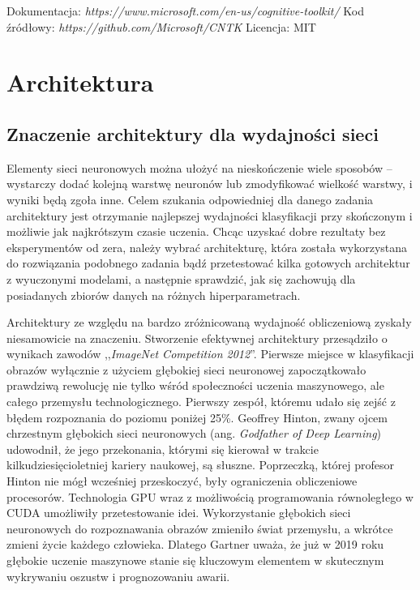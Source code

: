 \documentclass[12pt,a4paper,twoside,titlepage,openright]{book}
\begin{document}
\begin{itemize}
\noindent
\newline
Dokumentacja: \textit{https://www.microsoft.com/en-us/cognitive-toolkit/}
\newline
Kod źródłowy: \textit{https://github.com/Microsoft/CNTK}
\newline
Licencja: MIT



\chapter{Architektura}
\section{Znaczenie architektury dla wydajności sieci}
Elementy sieci neuronowych można ułożyć na nieskończenie wiele sposobów -- wystarczy dodać kolejną warstwę neuronów lub zmodyfikować wielkość warstwy, i wyniki będą zgoła inne. Celem szukania odpowiedniej dla danego zadania architektury jest otrzymanie najlepszej wydajności klasyfikacji przy skończonym i możliwie jak najkrótszym czasie uczenia. Chcąc uzyskać dobre rezultaty bez eksperymentów od zera, należy wybrać architekturę, która została wykorzystana do rozwiązania podobnego zadania bądź przetestować kilka gotowych architektur z wyuczonymi modelami, a następnie sprawdzić, jak się zachowują dla posiadanych zbiorów danych na różnych hiperparametrach.

Architektury ze względu na bardzo zróżnicowaną wydajność obliczeniową zyskały niesamowicie na znaczeniu. Stworzenie efektywnej architektury przesądziło o wynikach zawodów ,,\textit{ImageNet Competition 2012}''. Pierwsze miejsce w klasyfikacji obrazów wyłącznie z użyciem głębokiej sieci neuronowej zapoczątkowało prawdziwą rewolucję nie tylko wśród społeczności uczenia maszynowego, ale całego przemysłu technologicznego. Pierwszy zespół, któremu udało się zejść z błędem rozpoznania do poziomu poniżej 25\%. Geoffrey Hinton, zwany ojcem chrzestnym głębokich sieci neuronowych (ang. \textit{Godfather of Deep Learning}) udowodnił, że jego przekonania, którymi się kierował w trakcie kilkudziesięcioletniej kariery naukowej, są słuszne. Poprzeczką, której profesor Hinton nie mógł wcześniej przeskoczyć, były ograniczenia obliczeniowe procesorów. Technologia GPU wraz z możliwością programowania równoległego w CUDA umożliwiły przetestowanie idei. Wykorzystanie głębokich sieci neuronowych do rozpoznawania obrazów zmieniło świat przemysłu, a wkrótce zmieni życie każdego człowieka. Dlatego Gartner uważa, że już w 2019 roku głębokie uczenie maszynowe stanie się kluczowym elementem w skutecznym wykrywaniu oszustw i prognozowaniu awarii.\cite{siteGartner2019}


\end{itemize}
\end{document}
